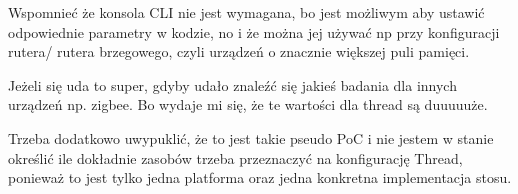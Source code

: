Wspomnieć że konsola CLI nie jest wymagana, bo jest możliwym aby ustawić odpowiednie parametry w kodzie, no i że można jej używać np przy konfiguracji rutera/ rutera brzegowego, czyli urządzeń o znacznie większej puli pamięci.

Jeżeli się uda to super, gdyby udało znaleźć się jakieś badania dla innych urządzeń np. zigbee. Bo wydaje mi się, że te wartości dla thread są duuuuuże.

Trzeba dodatkowo uwypuklić, że to jest takie pseudo PoC i nie jestem w stanie określić ile dokładnie zasobów trzeba przeznaczyć na konfigurację Thread, ponieważ to jest tylko jedna platforma oraz jedna konkretna implementacja stosu.




